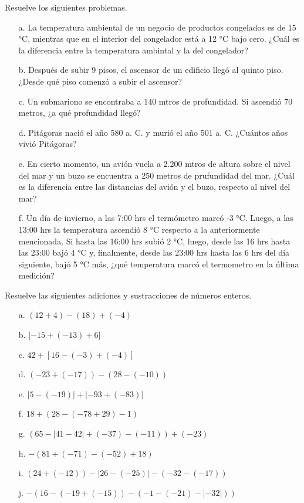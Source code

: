 \documentclass[spanish,letterpaper, 11pt, addpoints, answers]{exam}
\begin{document}
\begin{questions}
\begin{itemize}
\begin{center}
\begin{tabular}{|c|c|c|>{\centering\arraybackslash}p{3.5cm}|>{\centering\arraybackslash}p{3.5cm}|}
    
  \end{tabular}
\end{center}
\end{itemize}

\question Resuelve los siguientes problemas.

\begin{itemize}
  \item[a.] La temperatura ambiental de un negocio de productos congelados es de 15 °C, mientras que en el interior del congelador está a 12 °C bajo cero. ¿Cuál es la diferencia entre la temperatura ambintal y la del congelador?
  \item[b.] Después de subir 9 pisos, el ascensor de un edificio llegó al quinto piso. ¿Desde qué piso comenzó a subir el ascensor?
  \item[c.] Un submariono se encontraba a 140 mtros de profundidad. Si ascendió 70 metros, ¿a qué profundidad llegó?
  \item[d.] Pitágoras nació el año 580 a. C. y murió el año 501 a. C. ¿Cuántos años vivió Pitágoras?
  \item[e.] En cierto momento, un avión vuela a 2.200 mtros de altura sobre el nivel del mar y un buzo se encuentra a 250 metros de prufundidad del mar. ¿Cuál es la diferencia entre las distancias del avión y el buzo, respecto al nivel del mar?    
  \item[f.] Un día de invierno, a las 7:00 hrs el termómetro marcó -3 °C. Luego, a las 13:00 hrs la temperatura ascendió 8 °C respecto a la anteriormente mencionada. Si hasta las 16:00 hrs subió 2 °C, luego, desde las 16 hrs hasta las 23:00 bajó 4 °C y, finalmente, desde las 23:00 hrs hasta las 6 hrs del dia siguiente, bajó 5 °C más, ¿qué temperatura marcó el termometro en la última medición? 
\end{itemize}

\question Resuelve las siguientes adiciones y sustracciones de números enteros.

\begin{itemize}
  \item[a.] $(12+4)-(18)+(-4)$
  \item[b.] $|-15+(-13)+6|$
  \item[c.] $42+\left[16-(-3)+(-4)\right]$
  \item[d.] $\left(-23+(-17)\right)-\left(28-(-10)\right)$
  \item[e.] $\left|5-(-19)\right|+\left|-93+(-83)\right|$
  \item[f.] $18+\left(28-\left(-78+29\right)-1\right)$
  \item[g.] $\left(65-\left|41-42\right|+(-37)-(-11)\right)+(-23)$
  \item[h.] $-\left(81+(-71)-(-52)+18\right)$
  \item[i.] $\left(24+(-12)\right)-\left|26-(-25)\right|-\left(-32-(-17)\right)$
  \item[j.] $-\left(16-\left(-19+(-15)\right)-\left(-1-(-21)-|-32|\right)\right)$       
\end{itemize}


\end{questions}
\end{document}
